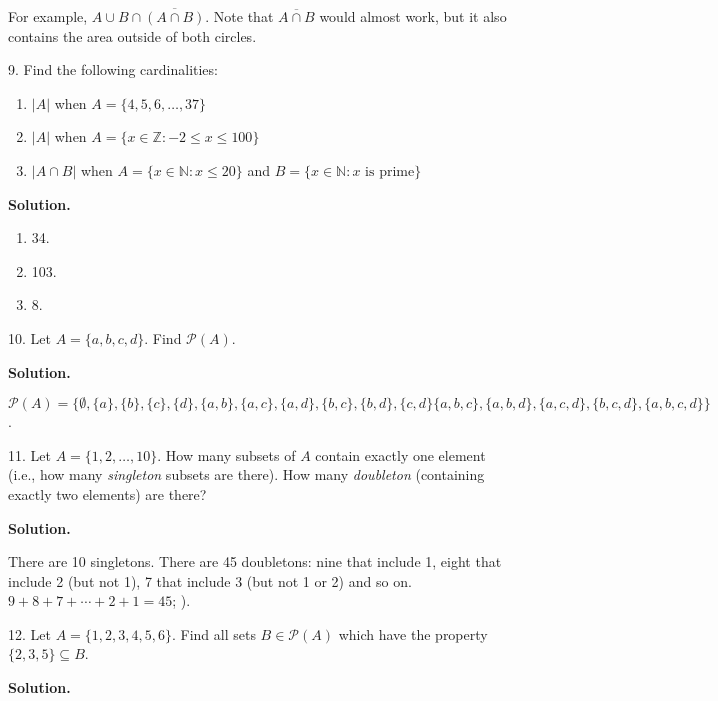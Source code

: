 \documentclass[10pt,]{book}
\theoremstyle{plain}
\theoremstyle{definition}
\theoremstyle{definition}
\theoremstyle{definition}
\def\N{\mathbb N}
\def\Z{\mathbb Z}
\def\pow{\mathcal P}
\def\st{:}
\renewcommand{\bar}{\overline}
\begin{document}
\begin{exerciselist}
          For example, \(A \cup B \cap \bar{(A \cap B)}\). Note that \(\bar{A \cap B}\) would almost work, but it also contains the area outside of both circles.
\item[9.]\hypertarget{exercise-19}{}
          Find the following cardinalities:
\leavevmode%
\begin{enumerate}[label=(\alph*)]
\item\hypertarget{li-270}{}\(|A|\) when \(A = \{4,5,6,\ldots,37\}\)\item\hypertarget{li-271}{}\(|A|\) when \(A = \{x \in \Z \st -2 \le x \le 100\}\)\item\hypertarget{li-272}{}\(|A \cap B|\) when \(A = \{x \in \N \st x \le 20\}\) and \(B = \{x \in \N \st x \mbox{ is prime} \}\)\end{enumerate}
\par\smallskip
\par\smallskip
\noindent\textbf{Solution.}\hypertarget{solution-31}{}\quad
\leavevmode%
\begin{enumerate}[label=(\alph*)]
\item\hypertarget{li-273}{} 34. %
\item\hypertarget{li-274}{} 103. %
\item\hypertarget{li-275}{} 8. %
\end{enumerate}
\item[10.]\hypertarget{exercise-20}{}
          Let \(A = \{a, b, c, d\}\). Find \(\pow(A)\).
\par\smallskip
\par\smallskip
\noindent\textbf{Solution.}\hypertarget{solution-32}{}\quad

          \(\pow(A) = \{\emptyset, \{a\}, \{b\}, \{c\}, \{d\}, \{a,b\}, \{a,c\}, \{a,d\}, \{b,c\}, \{b,d\}, \{c,d\} \{a,b,c\}, \{a,b,d\}, \{a,c,d\}, \{b,c,d\}, \{a,b,c,d\}\}\).
\item[11.]\hypertarget{exercise-21}{}
          Let \(A = \{1,2,\ldots, 10\}\). How many subsets of \(A\) contain exactly one element (i.e., how many \emph{singleton} subsets are there). How many \emph{doubleton} (containing exactly two elements) are there?
\par\smallskip
\par\smallskip
\noindent\textbf{Solution.}\hypertarget{solution-33}{}\quad

          There are 10 singletons. There are 45 doubletons: nine that include 1, eight that include 2 (but not 1), 7 that include 3 (but not 1 or 2) and so on. \(9+8+7+\cdots+2+1 = 45\); ).
\item[12.]\hypertarget{exercise-22}{}
          Let \(A = \{1,2,3,4,5,6\}\). Find all sets \(B \in \pow(A)\) which have the property \(\{2,3,5\} \subseteq B\).
\par\smallskip
\par\smallskip
\noindent\textbf{Solution.}\hypertarget{solution-34}{}\quad


\end{exerciselist}
\end{document}
